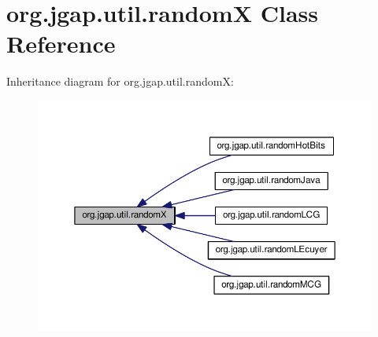 \hypertarget{classorg_1_1jgap_1_1util_1_1random_x}{\section{org.\-jgap.\-util.\-random\-X Class Reference}
\label{classorg_1_1jgap_1_1util_1_1random_x}
}


Inheritance diagram for org.\-jgap.\-util.\-random\-X\-:
\nopagebreak
\begin{figure}[H]
\begin{center}
\leavevmode
\includegraphics[width=350pt]{classorg_1_1jgap_1_1util_1_1random_x__inherit__graph}
\end{center}
\end{figure}
